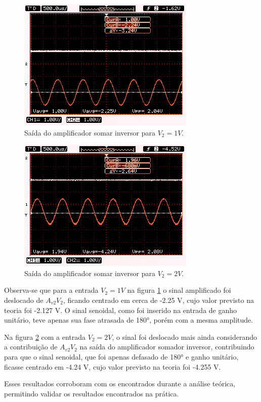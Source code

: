 \begin{figure}[H] 
\includegraphics[scale=2.5]{imagens/p5-v2-1V.jpg} 
\centering
\caption{Saída do amplificador somar inversor para $V_2=1V$.}
\label{p5-1} 
\end{figure} 

\begin{figure}[H] 
\includegraphics[scale=2.5]{imagens/p5-v2-2V.jpg} 
\centering
\caption{Saída do amplificador somar inversor para $V_2=2V$.}
\label{p5-2} 
\end{figure} 

Observa-se que para a entrada $V_2= 1V$ na figura \ref{p5-1} o sinal amplificado foi deslocado de $A_{v2}V_2$, ficando centrado em cerca de -2.25 V, cujo valor previsto na teoria foi -2.127 V. O sinal senoidal, como foi inserido na entrada de ganho unitário, teve apenas sua fase atrasada de 180°, porém com a mesma amplitude.

Na figura \ref{p5-2} com a entrada $V_2= 2V$, o sinal foi deslocado mais ainda considerando a contribuição de $A_{v2}V_2$ na saída do amplificador somador inversor, contribuindo para que o sinal senoidal, que foi apenas defasado de 180° e ganho unitário, ficasse centrado em -4.24 V, cujo valor previsto na teoria foi -4.255 V.

Esses resultados corroboram com os encontrados durante a análise teórica, permitindo validar os resultados encontrados na prática.

